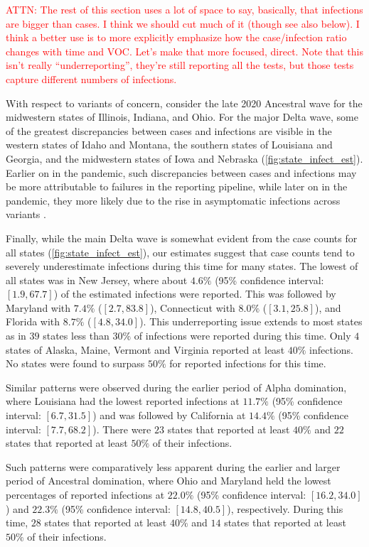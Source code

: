 \documentclass{article}
\newcommand{\attn }[1]{\textcolor{red}{ATTN: #1}}
\begin{document}
\attn{The rest of this section uses a lot of space to say, basically, that
infections are bigger than cases. I think we should cut much of it (though see
also below). I think a
better use is to more explicitly emphasize how the case/infection ratio changes
with time and VOC. Let's make that more focused, direct. Note that this isn't
really ``underreporting'', they're still reporting all the tests, but those
tests capture different numbers of infections.}

With respect to variants of concern, consider the late 2020
Ancestral wave for the midwestern states of Illinois, Indiana, and Ohio. For the
major Delta wave, some of the greatest discrepancies between cases and
infections are visible in the western states of Idaho and Montana, the southern
states of Louisiana and Georgia, and the midwestern states of Iowa and Nebraska
(\autoref{fig:state_infect_est}). Earlier on in the pandemic, such discrepancies
between cases and infections may be more attributable to failures in the
reporting pipeline, while later on in the pandemic, they more likely due to the
rise in asymptomatic infections across variants \citep{oph2022covid,
garrett2022high}. 

Finally, while the main Delta wave is somewhat evident from the case counts for
all states (\autoref{fig:state_infect_est}), our estimates suggest that case
counts tend to severely underestimate infections during this time for many
states. The lowest of all states was in New Jersey, where about $4.6\%$ (95\%
confidence interval: $[1.9, 67.7]$) of the estimated infections were reported.
This was followed by Maryland with $7.4\%$ ($[2.7, 83.8]$), Connecticut with
$8.0\%$ ($[3.1, 25.8]$), and Florida with $8.7\%$ ($[4.8, 34.0]$). This
underreporting issue extends to most states as in $39$ states less than $30\%$
of infections were reported during this time. Only $4$ states of Alaska, Maine,
Vermont and Virginia reported at least $40\%$ infections. No states were found
to surpass $50\%$ for reported infections for this time.

Similar patterns were observed during the earlier period of Alpha domination,
where Louisiana had the lowest reported infections at $11.7\%$ (95\% confidence
interval: $[6.7, 31.5]$) and was followed by California at $14.4\%$ (95\%
confidence interval: $[7.7, 68.2]$). There were $23$ states that reported at
least $40\%$ and $22$ states that reported at least $50\%$ of their infections.

Such patterns were comparatively less apparent during the earlier and larger
period of Ancestral domination, where Ohio and Maryland held the lowest
percentages of reported infections at $22.0\%$ (95\% confidence interval:
$[16.2, 34.0]$) and $22.3\%$ (95\% confidence interval: $[14.8, 40.5]$),
respectively. During this time, $28$ states that reported at least $40\%$ and
$14$ states that reported at least $50\%$ of their infections. 
\end{document}
